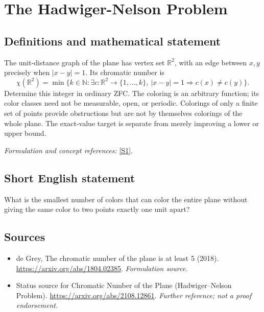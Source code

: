 \documentclass[11pt]{article}
\begin{document}
\section*{\texorpdfstring{The Hadwiger-Nelson Problem}{The Hadwiger-Nelson Problem}}\label{statement}
\subsection{Definitions and mathematical statement}
The unit-distance graph of the plane has vertex set ${\mathbb{R}}^2$, with an edge between $x,y$ precisely when $|x-y|=1$. Its chromatic number is
\[
 \chi({\mathbb{R}}^2)=\min\{k\in{\mathbb{N}}:\exists c:{\mathbb{R}}^2\to\{1,\ldots,k\},
 \ |x-y|=1\Rightarrow c(x)\ne c(y)\}.
\]
Determine this integer in ordinary ZFC. The coloring is an arbitrary function; its color classes need not be measurable, open, or periodic. Colorings of only a finite set of points provide obstructions but are not by themselves colorings of the whole plane. The exact-value target is separate from merely improving a lower or upper bound.
\par\smallskip\textit{Formulation and concept references:} \href{https://arxiv.org/abs/1804.02385}{[S1]}.

\subsection{Short English statement}
What is the smallest number of colors that can color the entire plane without giving the same color to two points exactly one unit apart?
\subsection{Sources}
\begin{itemize}
\item[S1]de Grey, The chromatic number of the plane is at least 5 (2018).
\url{https://arxiv.org/abs/1804.02385}.
\textit{Formulation source.}
\item[S2]Status source for Chromatic Number of the Plane (Hadwiger--Nelson Problem).
\url{https://arxiv.org/abs/2108.12861}.
\textit{Further reference; not a proof endorsement.}
\end{itemize}
\end{document}

